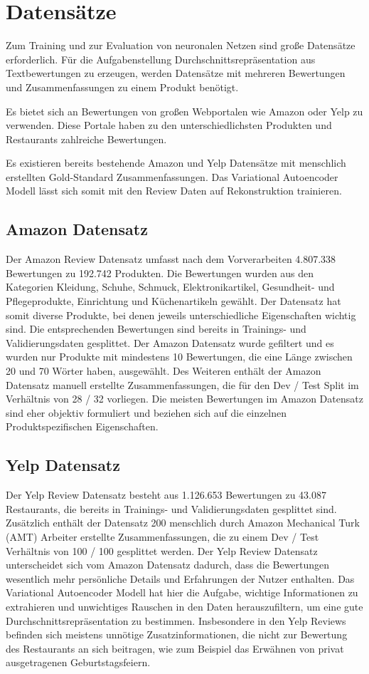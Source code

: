 \section{Datensätze}\raggedbottom

Zum Training und zur Evaluation von neuronalen Netzen sind große Datensätze erforderlich. Für die Aufgabenstellung Durchschnittsrepräsentation aus Textbewertungen zu erzeugen, werden Datensätze mit mehreren Bewertungen und Zusammenfassungen zu einem Produkt benötigt.

Es bietet sich an Bewertungen von großen Webportalen wie Amazon oder Yelp zu verwenden. 
Diese Portale haben zu den unterschiedlichsten Produkten und Restaurants zahlreiche Bewertungen.

Es existieren bereits bestehende Amazon und Yelp Datensätze mit menschlich erstellten Gold-Standard Zusammenfassungen. 
Das Variational Autoencoder Modell lässt sich somit mit den Review Daten auf Rekonstruktion trainieren.

\subsection{Amazon Datensatz}
Der Amazon Review Datensatz \citep{brazinskas2020-unsupervised} umfasst nach dem Vorverarbeiten 4.807.338 Bewertungen zu 192.742 Produkten. 
Die Bewertungen wurden aus den Kategorien Kleidung, Schuhe, Schmuck, Elektronikartikel, Gesundheit- und Pflegeprodukte, Einrichtung und Küchenartikeln gewählt.
Der Datensatz hat somit diverse Produkte, bei denen jeweils unterschiedliche Eigenschaften wichtig sind.
Die entsprechenden Bewertungen sind bereits in Trainings- und Validierungsdaten gesplittet.
Der Amazon Datensatz wurde gefiltert und es wurden nur Produkte mit mindestens 10 Bewertungen, die eine Länge zwischen 20 und 70 Wörter haben, ausgewählt.
Des Weiteren enthält der Amazon Datensatz manuell erstellte Zusammenfassungen, die für den Dev / Test Split im Verhältnis von 28 / 32 vorliegen.
Die meisten Bewertungen im Amazon Datensatz sind eher objektiv formuliert und beziehen sich auf die einzelnen Produktspezifischen Eigenschaften.
\subsection{Yelp Datensatz}
Der Yelp Review Datensatz \citep{pmlr-v97-chu19b} besteht aus 1.126.653 Bewertungen zu 43.087 Restaurants, die bereits in Trainings- und Validierungsdaten gesplittet sind. 
Zusätzlich enthält der Datensatz 200 menschlich durch Amazon Mechanical Turk (AMT) Arbeiter erstellte Zusammenfassungen, die zu einem Dev / Test Verhältnis von 100 / 100 gesplittet werden. 
Der Yelp Review Datensatz unterscheidet sich vom Amazon Datensatz dadurch, dass die Bewertungen wesentlich mehr persönliche Details und Erfahrungen der Nutzer enthalten.
Das Variational Autoencoder Modell hat hier die Aufgabe, wichtige Informationen zu extrahieren und unwichtiges Rauschen in den Daten herauszufiltern, um eine gute Durchschnittsrepräsentation zu bestimmen.
Insbesondere in den Yelp Reviews befinden sich meistens unnötige Zusatzinformationen, die nicht zur Bewertung des Restaurants an sich beitragen, wie zum Beispiel das Erwähnen von privat ausgetragenen Geburtstagsfeiern. 
\pagebreak
